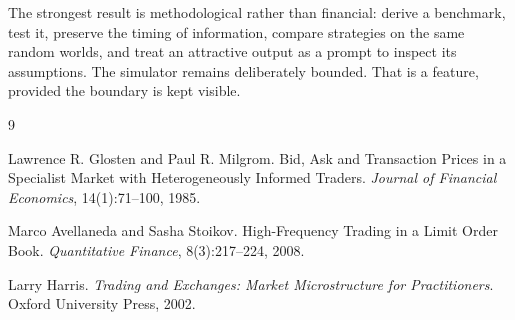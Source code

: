 \documentclass[11pt]{article}
\begin{document}
The strongest result is methodological rather than financial: derive a benchmark, test it, preserve the timing of information, compare strategies on the same random worlds, and treat an attractive output as a prompt to inspect its assumptions. The simulator remains deliberately bounded. That is a feature, provided the boundary is kept visible.

\begin{thebibliography}{9}

Lawrence R. Glosten and Paul R. Milgrom.
\newblock Bid, Ask and Transaction Prices in a Specialist Market with Heterogeneously Informed Traders.
\newblock \emph{Journal of Financial Economics}, 14(1):71--100, 1985.

Marco Avellaneda and Sasha Stoikov.
\newblock High-Frequency Trading in a Limit Order Book.
\newblock \emph{Quantitative Finance}, 8(3):217--224, 2008.

Larry Harris.
\newblock \emph{Trading and Exchanges: Market Microstructure for Practitioners}.
\newblock Oxford University Press, 2002.

\end{thebibliography}
\end{document}
